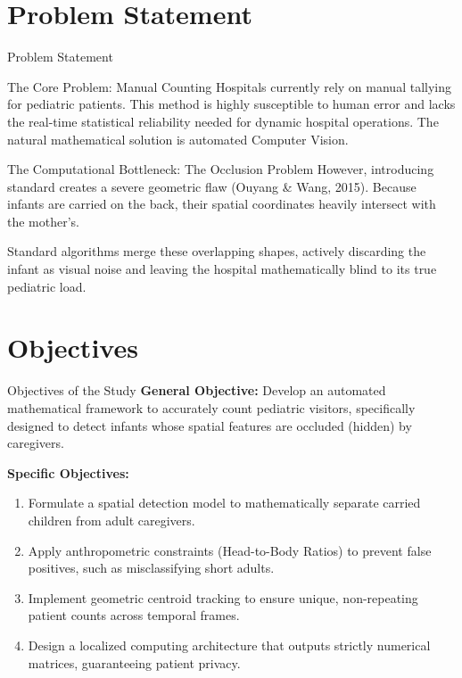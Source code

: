 \documentclass[11pt, aspectratio=169]{beamer}
\begin{document}
\section{Problem Statement}
\begin{frame}{Problem Statement}
    \begin{block}{The Core Problem: Manual Counting}
        Hospitals currently rely on manual tallying for pediatric patients. This method is highly susceptible to human error and lacks the real-time statistical reliability needed for dynamic hospital operations. The natural mathematical solution is automated Computer Vision.
    \end{block}
    
    \vspace{0.3cm}
    \begin{block}{The Computational Bottleneck: The Occlusion Problem}
        However, introducing standard creates a severe geometric flaw (Ouyang \& Wang, 2015). Because infants are carried on the back, their spatial coordinates heavily intersect with the mother's. 
        
        \vspace{0.2cm}
        Standard algorithms merge these overlapping shapes, actively discarding the infant as visual noise and leaving the hospital mathematically blind to its true pediatric load.
    \end{block}
\end{frame}

\section{Objectives}
\begin{frame}{Objectives of the Study}
    \textbf{General Objective:} Develop an automated mathematical framework to accurately count pediatric visitors, specifically designed to detect infants whose spatial features are occluded (hidden) by caregivers.
    
    \vspace{0.4cm}
    \textbf{Specific Objectives:}
    \begin{enumerate}
        \item Formulate a spatial detection model to mathematically separate carried children from adult caregivers.
        \item Apply anthropometric constraints (Head-to-Body Ratios) to prevent false positives, such as misclassifying short adults.
        \item Implement geometric centroid tracking to ensure unique, non-repeating patient counts across temporal frames.
        \item Design a localized computing architecture that outputs strictly numerical matrices, guaranteeing patient privacy.
    \end{enumerate}
\end{frame}
\end{document}
